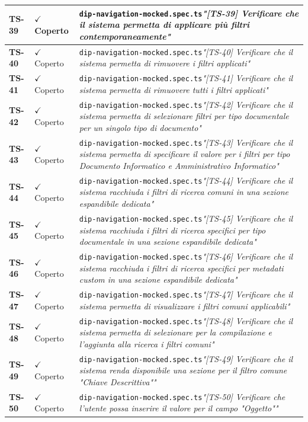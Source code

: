 \documentclass[a4paper,12pt]{article}
\newcommand{\ok}{\textcolor{green!60!black}{$\checkmark$ Coperto}}
\newcommand{\f}[1]{\nolinkurl{#1}\newline}
\newcommand{\q}[1]{\textit{#1}}
\begin{document}
\begin{longtable}{|p{1.5cm}|p{3.0cm}|p{10.5cm}|}
\textbf{TS-39} & \ok & \f{dip-navigation-mocked.spec.ts}\q{"[TS-39] Verificare che il sistema permetta di applicare più filtri contemporaneamente"} \\ \hline
\textbf{TS-40} & \ok & \f{dip-navigation-mocked.spec.ts}\q{"[TS-40] Verificare che il sistema permetta di rimuovere i filtri applicati"} \\ \hline
\textbf{TS-41} & \ok & \f{dip-navigation-mocked.spec.ts}\q{"[TS-41] Verificare che il sistema permetta di rimuovere tutti i filtri applicati"} \\ \hline
\textbf{TS-42} & \ok & \f{dip-navigation-mocked.spec.ts}\q{"[TS-42] Verificare che il sistema permetta di selezionare filtri per tipo documentale per un singolo tipo di documento"} \\ \hline
\textbf{TS-43} & \ok & \f{dip-navigation-mocked.spec.ts}\q{"[TS-43] Verificare che il sistema permetta di specificare il valore per i filtri per tipo Documento Informatico e Amministrativo Informatico"} \\ \hline
\textbf{TS-44} & \ok & \f{dip-navigation-mocked.spec.ts}\q{"[TS-44] Verificare che il sistema racchiuda i filtri di ricerca comuni in una sezione espandibile dedicata"} \\ \hline
\textbf{TS-45} & \ok & \f{dip-navigation-mocked.spec.ts}\q{"[TS-45] Verificare che il sistema racchiuda i filtri di ricerca specifici per tipo documentale in una sezione espandibile dedicata"} \\ \hline
\textbf{TS-46} & \ok & \f{dip-navigation-mocked.spec.ts}\q{"[TS-46] Verificare che il sistema racchiuda i filtri di ricerca specifici per metadati custom in una sezione espandibile dedicata"} \\ \hline
\textbf{TS-47} & \ok & \f{dip-navigation-mocked.spec.ts}\q{"[TS-47] Verificare che il sistema permetta di visualizzare i filtri comuni applicabili"} \\ \hline
\textbf{TS-48} & \ok & \f{dip-navigation-mocked.spec.ts}\q{"[TS-48] Verificare che il sistema permetta di selezionare per la compilazione e l'aggiunta alla ricerca i filtri comuni"} \\ \hline
\textbf{TS-49} & \ok & \f{dip-navigation-mocked.spec.ts}\q{"[TS-49] Verificare che il sistema renda disponibile una sezione per il filtro comune "Chiave Descrittiva""} \\ \hline
\textbf{TS-50} & \ok & \f{dip-navigation-mocked.spec.ts}\q{"[TS-50] Verificare che l'utente possa inserire il valore per il campo "Oggetto""} \\ \hline

\end{longtable}
\end{document}
